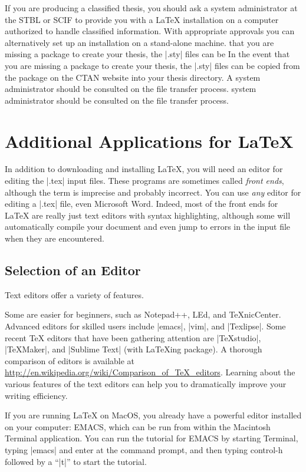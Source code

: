 If you are producing a classified thesis, you should ask a system administrator
at the STBL or SCIF to provide you with a \LaTeX{} installation on a computer
authorized to handle classified information. With appropriate approvals you can
alternatively set up an installation on a stand-alone machine.  that you are
missing a package to create your thesis, the |.sty| files can be In the event
that you are missing a package to create your thesis, the |.sty| files can be
copied from the package on the CTAN website into your thesis directory.  A
system administrator should be consulted on the file transfer process.  system
administrator should be consulted on the file transfer process.  

\section{Additional Applications for \LaTeX{} }

In addition to downloading and installing \LaTeX, you will need an editor for
editing the |.tex| input files. These programs are sometimes called \emph{front
ends}, although the term is imprecise and probably incorrect. You can use
\emph{any} editor for editing a |.tex| file, even Microsoft Word. Indeed, most
of the front ends for \LaTeX{} are really just text editors with syntax
highlighting, although some will automatically compile your document and even
jump to errors in the input file when they are encountered.

\subsection{Selection of an Editor} Text editors offer a variety of features.

Some are easier for beginners, such as Notepad++, LEd, and TeXnicCenter.
Advanced editors for skilled users include |emacs|, |vim|, and |Texlipse|.
Some recent TeX editors that have been gathering attention are |TeXstudio|,
|TeXMaker|, and |Sublime Text| (with LaTeXing package).  A thorough comparison
of editors is available at
\url{http://en.wikipedia.org/wiki/Comparison_of_TeX_editors}.  Learning about
the various features of the text editors can help you to dramatically improve
your writing efficiency.

If you are running \LaTeX{} on MacOS, you already have a powerful editor
installed on your computer: EMACS, which can be run from within the Macintosh
Terminal application. You can run the tutorial for EMACS by starting Terminal,
typing |emacs| and enter at the command prompt, and then typing control-h
followed by a ``|t|'' to start the tutorial.

